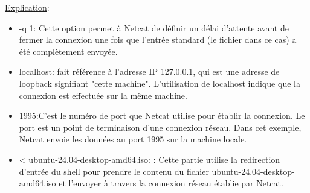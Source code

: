 \documentclass[a4paper,11pt]{article}
\begin{document}
\begin{itemize}
                    \noindent \underline{Explication}:
                    \begin{itemize}
                        \item -q 1: Cette option permet à Netcat de définir un délai d'attente avant de fermer la connexion une fois que l'entrée standard (le fichier dans ce cas) a été complètement envoyée.
                        \item localhost:  fait référence à l'adresse IP 127.0.0.1, qui est une adresse de loopback signifiant "cette machine". L'utilisation de localhost indique que la connexion est effectuée sur la même machine.
                        \item 1995:C'est le numéro de port que Netcat utilise pour établir la connexion. Le port est un point de terminaison d'une connexion réseau. Dans cet exemple, Netcat envoie les données au port 1995 sur la machine locale.
                        \item < ubuntu-24.04-desktop-amd64.iso: : Cette partie utilise la redirection d'entrée du shell pour prendre le contenu du fichier ubuntu-24.04-desktop-amd64.iso et l'envoyer à travers la connexion réseau établie par Netcat.
                    \end{itemize}
            \end{itemize}
\end{document}

